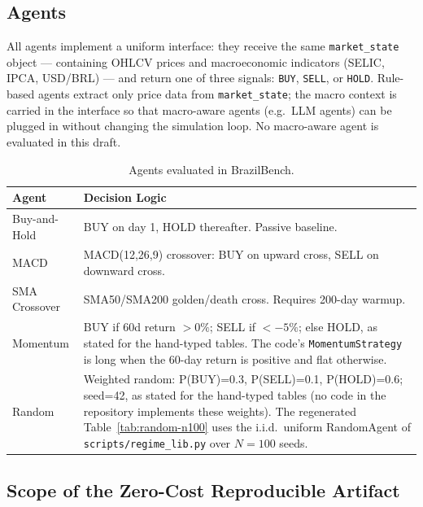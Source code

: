 \documentclass{article}
\begin{document}
\subsection{Agents}

All agents implement a uniform interface: they receive the same
\texttt{market\_state} object --- containing OHLCV prices and
macroeconomic indicators (SELIC, IPCA, USD/BRL) --- and return one
of three signals: \texttt{BUY}, \texttt{SELL}, or \texttt{HOLD}.
Rule-based agents extract only price data from \texttt{market\_state};
the macro context is carried in the interface so that macro-aware
agents (e.g.\ LLM agents) can be plugged in without changing the
simulation loop. No macro-aware agent is evaluated in this draft.

\begin{table}[h]
\centering
\caption{Agents evaluated in BrazilBench.}
\label{tab:agents}
\begin{tabular}{lp{8cm}}
\toprule
\textbf{Agent} & \textbf{Decision Logic} \\
\midrule
Buy-and-Hold  & BUY on day 1, HOLD thereafter. Passive baseline. \\
MACD          & MACD(12,26,9) crossover: BUY on upward cross,
                SELL on downward cross. \\
SMA Crossover & SMA50/SMA200 golden/death cross. Requires 200-day
                warmup. \\
Momentum      & BUY if 60d return $>0\%$; SELL if $<-5\%$; else HOLD,
                as stated for the hand-typed tables. The code's
                \texttt{MomentumStrategy} is long when the 60-day return
                is positive and flat otherwise. \\
Random        & Weighted random: P(BUY)=0.3, P(SELL)=0.1, P(HOLD)=0.6;
                seed=42, as stated for the hand-typed tables (no code in
                the repository implements these weights). The regenerated
                Table~\ref{tab:random-n100} uses the i.i.d.\ uniform
                RandomAgent of \texttt{scripts/regime\_lib.py} over
                $N{=}100$ seeds. \\
\bottomrule
\end{tabular}
\end{table}

\subsection{Scope of the Zero-Cost Reproducible Artifact}
\label{sec:scope}
\end{document}
